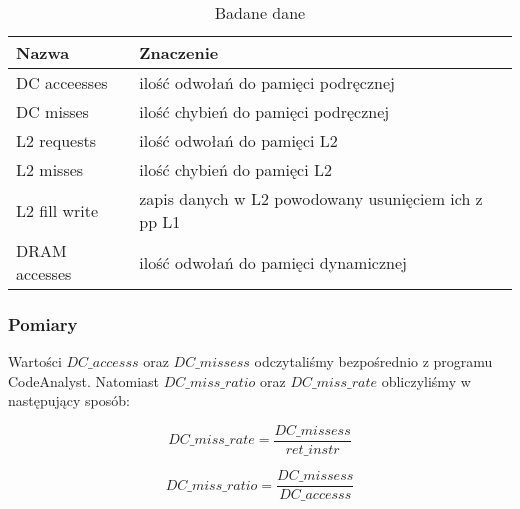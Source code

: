 \begin{table}[H]
\caption{Badane dane}
\begin{tabular}{|l|l|}

\hline
  Nazwa &
  Znaczenie \\
\hline
  DC acceesses &
  ilość odwołań do pamięci podręcznej \\
\hline
  DC misses &
  ilość chybień do pamięci podręcznej \\
\hline
  L2 requests &
  ilość odwołań do pamięci L2 \\
\hline
  L2 misses &
  ilość chybień do pamięci L2 \\
\hline
  L2 fill write &
  zapis danych w L2 powodowany usunięciem ich z pp L1 \\
\hline
  DRAM accesses &
  ilość odwołań do pamięci dynamicznej \\
\hline

\end{tabular}
\end{table}


\subsubsection{Pomiary}

Wartości $DC\_accesss$ oraz $DC\_missess$ odczytaliśmy bezpośrednio z programu CodeAnalyst. Natomiast $DC\_miss\_ratio$ oraz $DC\_miss\_rate$ obliczyliśmy w następujący sposób:

\begin{equation}
  DC\_miss\_rate = \frac{DC\_missess}{ret\_instr}
\end{equation}

\begin{equation}
  DC\_miss\_ratio = \frac{DC\_missess}{DC\_accesss}
\end{equation}

